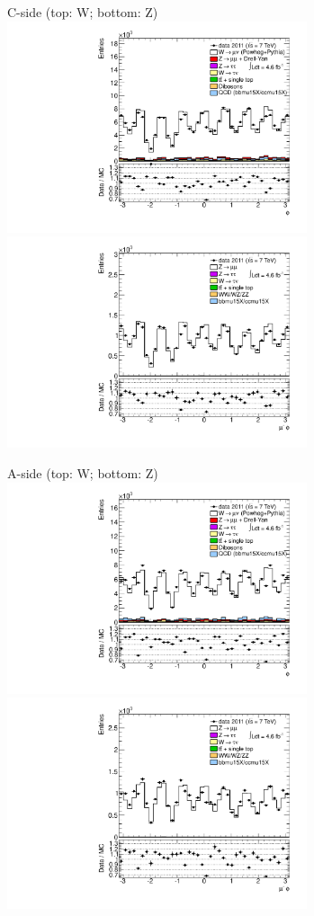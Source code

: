 {

\colb[T]

C-side (top: W; bottom: Z)
\centering
\includegraphics[width=0.66\textwidth]{dates/20130306/figures/etaphi/W_5_C_stack_l_phi_NEG} \\
\includegraphics[width=0.66\textwidth]{dates/20130306/figures/etaphi/Z_5_C_stack_lN_phi_ALL.pdf}

A-side (top: W; bottom: Z)
\centering
\includegraphics[width=0.66\textwidth]{dates/20130306/figures/etaphi/W_5_A_stack_l_phi_NEG} \\
\includegraphics[width=0.66\textwidth]{dates/20130306/figures/etaphi/Z_5_A_stack_lN_phi_ALL.pdf} 

\cole
}


